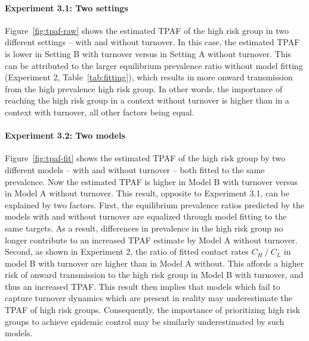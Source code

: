 \paragraph{Experiment 3.1: Two settings}
\label{p:res-tpaf-raw}
Figure~\ref{fig:tpaf-raw} shows the estimated TPAF of the high risk group
in two different settings -- with and without turnover.
In this case, the estimated TPAF is lower
in Setting B with turnover versus
in Setting A without turnover.
This can be attributed to
the larger equilibrium prevalence ratio without model fitting
(Experiment 2, Table~\ref{tab:fitting}),
which results in more onward transmission from the high prevalence high risk group.
In other words, the importance of reaching the high risk group
in a context without turnover is higher than in a context with turnover,
all other factors being equal.
\paragraph{Experiment 3.2: Two models}
\label{p:res-tpaf-fit}
Figure~\ref{fig:tpaf-fit} shows the estimated TPAF of the high risk group
by two different models -- with and without turnover --
both fitted to the same prevalence.
Now the estimated TPAF is higher
in Model B with turnover versus
in Model A without turnover.
This result, opposite to Experiment 3.1, can be explained by two factors.
First, the equilibrium prevalence ratios predicted by the models with and without turnover
are equalized through model fitting to the same targets.
As a result, differences in prevalence in the high risk group
no longer contribute to an increased TPAF estimate by Model A without turnover.
Second, as shown in Experiment 2, 
the ratio of fitted contact rates $C_H~/~C_L$ in model B with turnover
are higher than in Model A without.
This affords a higher risk of onward transmission to the high risk group
in Model B with turnover, and thus an increased TPAF.
This result then implies that
models which fail to capture turnover dynamics which are present in reality
may underestimate the TPAF of high risk groups.
Consequently, the importance of prioritizing high risk groups
to achieve epidemic control may be similarly underestimated by such models.
